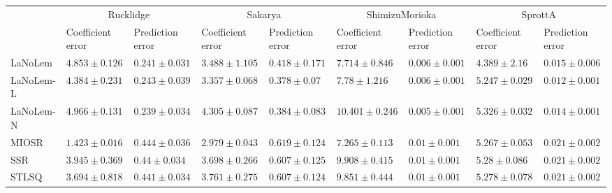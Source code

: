 \begin{table*}
{\begin{tabular}{lllllllll}
 & \multicolumn{2}{c}{Rucklidge} & \multicolumn{2}{c}{Sakarya} & \multicolumn{2}{c}{ShimizuMorioka} & \multicolumn{2}{c}{SprottA} \\
 & Coefficient error & Prediction error & Coefficient error & Prediction error & Coefficient error & Prediction error & Coefficient error & Prediction error \\
\midrule
LaNoLem & $4.853\pm 0.126$ & $0.241\pm 0.031$ & $3.488\pm 1.105$ & $0.418\pm 0.171$ & $7.714\pm 0.846$ & $0.006\pm 0.001$ & $\mathbf{4.389}\pm 2.16$ & $0.015\pm 0.006$ \\
LaNoLem-L & $4.384\pm 0.231$ & $0.243\pm 0.039$ & $3.357\pm 0.068$ & $\mathbf{0.378}\pm 0.07$ & $7.78\pm 1.216$ & $0.006\pm 0.001$ & $5.247\pm 0.029$ & $\mathbf{0.012}\pm 0.001$ \\
LaNoLem-N & $4.966\pm 0.131$ & $\mathbf{0.239}\pm 0.034$ & $4.305\pm 0.087$ & $0.384\pm 0.083$ & $10.401\pm 0.246$ & $\mathbf{0.005}\pm 0.001$ & $5.326\pm 0.032$ & $0.014\pm 0.001$ \\
MIOSR & $\mathbf{1.423}\pm 0.016$ & $0.444\pm 0.036$ & $\mathbf{2.979}\pm 0.043$ & $0.619\pm 0.124$ & $\mathbf{7.265}\pm 0.113$ & $0.01\pm 0.001$ & $5.267\pm 0.053$ & $0.021\pm 0.002$ \\
SSR & $3.945\pm 0.369$ & $0.44\pm 0.034$ & $3.698\pm 0.266$ & $0.607\pm 0.125$ & $9.908\pm 0.415$ & $0.01\pm 0.001$ & $5.28\pm 0.086$ & $0.021\pm 0.002$ \\
STLSQ & $3.694\pm 0.818$ & $0.441\pm 0.034$ & $3.761\pm 0.275$ & $0.607\pm 0.124$ & $9.851\pm 0.444$ & $0.01\pm 0.001$ & $5.278\pm 0.078$ & $0.021\pm 0.002$ \\

\midrule


\end{tabular}}
\end{table*}
